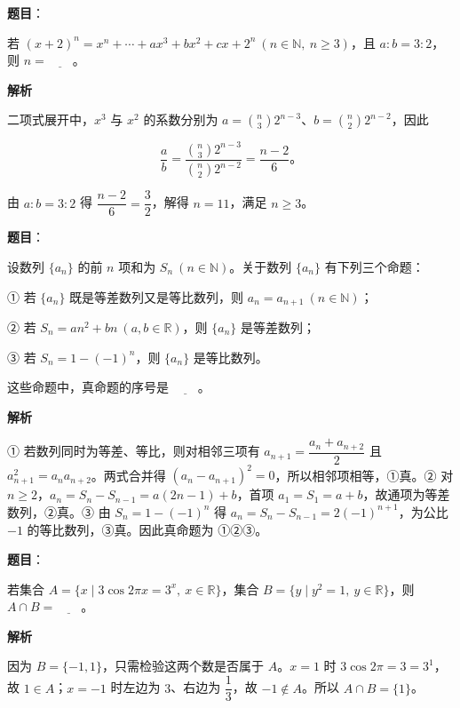 \begin{answer}

\textbf{题目}：

若 $(x+2)^n=x^n+\cdots+ax^3+bx^2+cx+2^n\ (n\in\mathbb N,\ n\ge3)$，且 $a:b=3:2$，则 $n=\underline{\qquad}$。

\textbf{解析}

二项式展开中，$x^3$ 与 $x^2$ 的系数分别为 $a=\binom n3 2^{n-3}$、$b=\binom n2 2^{n-2}$，因此

\nopagebreak[4]
\[
\frac ab=\frac{\binom n3 2^{n-3}}{\binom n2 2^{n-2}}=\frac{n-2}{6}\mbox{。}
\]

由 $a:b=3:2$ 得 $\dfrac{n-2}{6}=\dfrac32$，解得 $n=11$，满足 $n\geqslant3$。


\end{answer}
\begin{answer}

\textbf{题目}：

设数列 $\{a_n\}$ 的前 $n$ 项和为 $S_n\ (n\in\mathbb N)$。关于数列 $\{a_n\}$ 有下列三个命题：

① 若 $\{a_n\}$ 既是等差数列又是等比数列，则 $a_n=a_{n+1}\ (n\in\mathbb N)$；

② 若 $S_n=an^2+bn\ (a,b\in\mathbb R)$，则 $\{a_n\}$ 是等差数列；

③ 若 $S_n=1-(-1)^n$，则 $\{a_n\}$ 是等比数列。

这些命题中，真命题的序号是 $\underline{\qquad}$。

\textbf{解析}

① 若数列同时为等差、等比，则对相邻三项有 $a_{n+1}=\dfrac{a_n+a_{n+2}}2$ 且 $a_{n+1}^2=a_na_{n+2}$。两式合并得 $(a_n-a_{n+1})^2=0$，所以相邻项相等，①真。② 对 $n\ge2$，$a_n=S_n-S_{n-1}=a(2n-1)+b$，首项 $a_1=S_1=a+b$，故通项为等差数列，②真。③ 由 $S_n=1-(-1)^n$ 得 $a_n=S_n-S_{n-1}=2(-1)^{n+1}$，为公比 $-1$ 的等比数列，③真。因此真命题为 ①②③。


\end{answer}
\begin{answer}

\textbf{题目}：

若集合 $A=\{x\mid 3\cos 2\pi x=3^x,\ x\in\mathbb R\}$，集合 $B=\{y\mid y^2=1,\ y\in\mathbb R\}$，则 $A\cap B=\underline{\qquad}$。

\textbf{解析}

因为 $B=\{-1,1\}$，只需检验这两个数是否属于 $A$。$x=1$ 时 $3\cos2\pi=3=3^1$，故 $1\in A$；$x=-1$ 时左边为 $3$、右边为 $\dfrac13$，故 $-1\notin A$。所以 $A\cap B=\{1\}$。


\end{answer}
